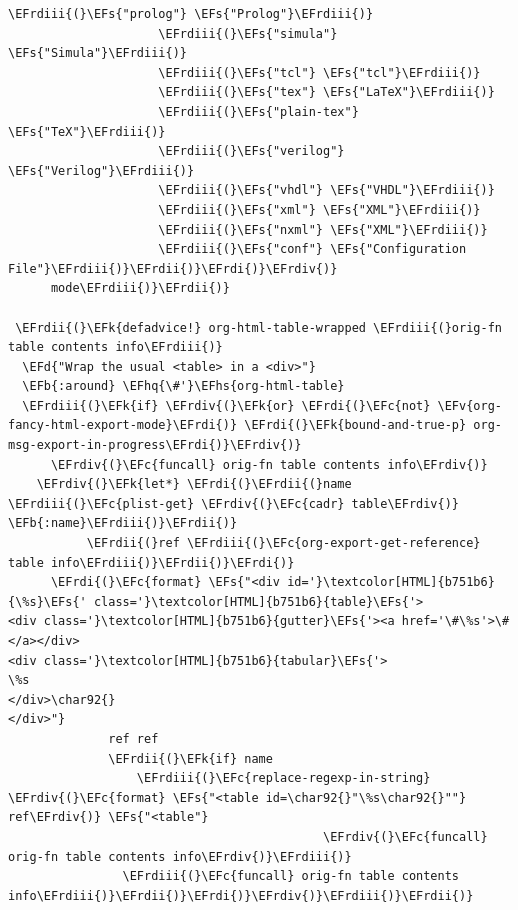 \documentclass{scrartcl}
\newcommand{\EFk}[1]{\textcolor{EFk}{#1}} %
\newcommand{\EFd}[1]{\textcolor{EFd}{\textit{#1}}} %
\newcommand{\EFs}[1]{\textcolor{EFs}{#1}} %
\newcommand{\EFb}[1]{\textcolor{EFb}{#1}} %
\newcommand{\EFc}[1]{\textcolor{EFc}{#1}} %
\newcommand{\EFv}[1]{\textcolor{EFv}{#1}} %
\newcommand{\EFhq}[1]{\textcolor{EFhq}{#1}} %
\newcommand{\EFhs}[1]{\textcolor{EFhs}{#1}} %
\newcommand{\EFrdi}[1]{\textcolor{EFrdi}{#1}} %
\newcommand{\EFrdii}[1]{\textcolor{EFrdii}{#1}} %
\newcommand{\EFrdiii}[1]{\textcolor{EFrdiii}{#1}} %
\newcommand{\EFrdiv}[1]{\textcolor{EFrdiv}{#1}} %
\begin{document}
\begin{Code}
\begin{Verbatim}[]
                     \EFrdiii{(}\EFs{"prolog"} \EFs{"Prolog"}\EFrdiii{)}
                     \EFrdiii{(}\EFs{"simula"} \EFs{"Simula"}\EFrdiii{)}
                     \EFrdiii{(}\EFs{"tcl"} \EFs{"tcl"}\EFrdiii{)}
                     \EFrdiii{(}\EFs{"tex"} \EFs{"LaTeX"}\EFrdiii{)}
                     \EFrdiii{(}\EFs{"plain-tex"} \EFs{"TeX"}\EFrdiii{)}
                     \EFrdiii{(}\EFs{"verilog"} \EFs{"Verilog"}\EFrdiii{)}
                     \EFrdiii{(}\EFs{"vhdl"} \EFs{"VHDL"}\EFrdiii{)}
                     \EFrdiii{(}\EFs{"xml"} \EFs{"XML"}\EFrdiii{)}
                     \EFrdiii{(}\EFs{"nxml"} \EFs{"XML"}\EFrdiii{)}
                     \EFrdiii{(}\EFs{"conf"} \EFs{"Configuration File"}\EFrdiii{)}\EFrdii{)}\EFrdi{)}\EFrdiv{)}
      mode\EFrdiii{)}\EFrdii{)}

 \EFrdii{(}\EFk{defadvice!} org-html-table-wrapped \EFrdiii{(}orig-fn table contents info\EFrdiii{)}
  \EFd{"Wrap the usual <table> in a <div>"}
  \EFb{:around} \EFhq{\#'}\EFhs{org-html-table}
  \EFrdiii{(}\EFk{if} \EFrdiv{(}\EFk{or} \EFrdi{(}\EFc{not} \EFv{org-fancy-html-export-mode}\EFrdi{)} \EFrdi{(}\EFk{bound-and-true-p} org-msg-export-in-progress\EFrdi{)}\EFrdiv{)}
      \EFrdiv{(}\EFc{funcall} orig-fn table contents info\EFrdiv{)}
    \EFrdiv{(}\EFk{let*} \EFrdi{(}\EFrdii{(}name \EFrdiii{(}\EFc{plist-get} \EFrdiv{(}\EFc{cadr} table\EFrdiv{)} \EFb{:name}\EFrdiii{)}\EFrdii{)}
           \EFrdii{(}ref \EFrdiii{(}\EFc{org-export-get-reference} table info\EFrdiii{)}\EFrdii{)}\EFrdi{)}
      \EFrdi{(}\EFc{format} \EFs{"<div id='}\textcolor[HTML]{b751b6}{\%s}\EFs{' class='}\textcolor[HTML]{b751b6}{table}\EFs{'>
<div class='}\textcolor[HTML]{b751b6}{gutter}\EFs{'><a href='\#\%s'>\#</a></div>
<div class='}\textcolor[HTML]{b751b6}{tabular}\EFs{'>
\%s
</div>\char92{}
</div>"}
              ref ref
              \EFrdii{(}\EFk{if} name
                  \EFrdiii{(}\EFc{replace-regexp-in-string} \EFrdiv{(}\EFc{format} \EFs{"<table id=\char92{}"\%s\char92{}""} ref\EFrdiv{)} \EFs{"<table"}
                                            \EFrdiv{(}\EFc{funcall} orig-fn table contents info\EFrdiv{)}\EFrdiii{)}
                \EFrdiii{(}\EFc{funcall} orig-fn table contents info\EFrdiii{)}\EFrdii{)}\EFrdi{)}\EFrdiv{)}\EFrdiii{)}\EFrdii{)}



\end{Verbatim}
\end{Code}
\end{document}
